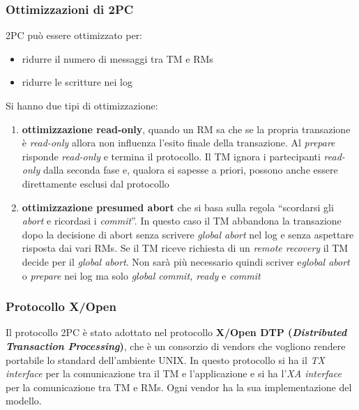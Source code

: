 \documentclass[a4paper,12pt, oneside]{book}
\begin{document}
\subsubsection{Ottimizzazioni di 2PC}
2PC può essere ottimizzato per:
\begin{itemize}
  \item ridurre il numero di messaggi tra TM e RMs
  \item ridurre le scritture nei log
\end{itemize}
Si hanno due tipi di ottimizzazione:
\begin{enumerate}
  \item \textbf{ottimizzazione read-only}, quando un RM sa che se la propria
  transazione è \textit{read-only} allora non influenza l'esito finale della
  transazione. Al \textit{prepare} risponde \textit{read-only} e termina il
  protocollo. Il TM ignora i partecipanti \textit{read-only} dalla seconda fase
  e, qualora si sapesse a priori, possono anche essere direttamente esclusi dal
  protocollo
  \item \textbf{ottimizzazione presumed abort} che si basa sulla regola
  ``scordarsi gli \textit{abort} e ricordasi i \textit{commit}''. In questo caso
  il TM abbandona la transazione dopo la decisione di abort senza scrivere
  \textit{global abort} nel log e senza aspettare risposta dai vari RMs. Se il
  TM riceve richiesta di un \textit{remote recovery} il TM decide per il
  \textit{global abort}. Non sarà più necessario quindi scriver e\textit{global
    abort} o \textit{prepare} nei log ma solo \textit{global commit, ready} e
  \textit{commit}
\end{enumerate}
\subsubsection{Protocollo X/Open}
Il protocollo 2PC è stato adottato nel protocollo \textbf{X/Open DTP
  (\textit{Distributed Transaction Processing})}, che è un 
consorzio di vendors che vogliono rendere portabile lo standard dell'ambiente
UNIX. In questo protocollo si ha il \textit{TX interface} per la comunicazione
tra il TM e l'applicazione e si ha l'\textit{XA interface} per la comunicazione
tra TM e RMs. Ogni vendor ha la sua implementazione del modello.
\end{document}
